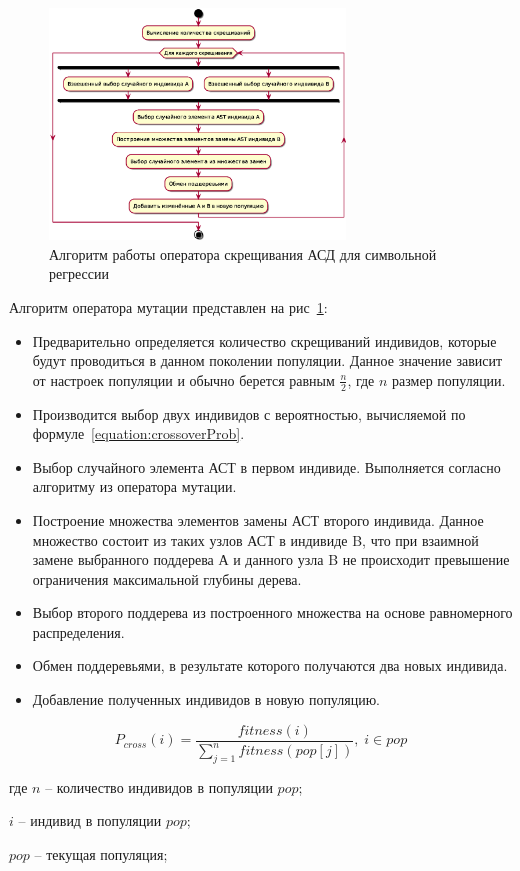 \begin{figure}[h!]
\centering
\includegraphics[width=0.7\textwidth]{science/crossover}
\caption{Алгоритм работы оператора скрещивания АСД для символьной регрессии}
\label{figure:astCrossover}
\end{figure}

Алгоритм оператора мутации представлен на рис~\ref{figure:astCrossover}:
\begin{itemize}
\item Предварительно определяется количество скрещиваний индивидов, которые будут проводиться в данном поколении популяции. Данное значение зависит от настроек популяции и обычно берется равным $\frac{n}{2}$, где $n$ размер популяции.
\item Производится выбор двух индивидов с вероятностью, вычисляемой по формуле~\ref{equation:crossoverProb}.
\item Выбор случайного элемента АСТ в первом индивиде. Выполняется согласно алгоритму из оператора мутации.
\item Построение множества элементов замены АСТ второго индивида. Данное множество состоит из таких узлов АСТ в индивиде B, что при взаимной замене выбранного поддерева А и данного узла B не происходит превышение ограничения максимальной глубины дерева.
\item Выбор второго поддерева из построенного множества на основе равномерного распределения.
\item Обмен поддеревьями, в результате которого получаются два новых индивида.
\item Добавление полученных индивидов в новую популяцию.
\end{itemize}

\begin{equation}
\label{equation:crossoverProb}
P_{cross}(i) = \frac{fitness(i)}{\sum_{j=1}^{n} fitness(pop[j]) }, \; i \in pop
\end{equation}
\begin{ESKDExplanation}
\item[где ] $n$ -- количество индивидов в популяции $pop$;
\item       $i$ -- индивид в популяции $pop$;
\item       $pop$ -- текущая популяция;
\end{ESKDExplanation}

